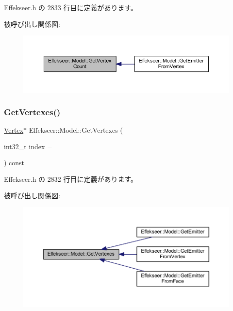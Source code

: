  Effekseer.\+h の 2833 行目に定義があります。

被呼び出し関係図\+:\nopagebreak
\begin{figure}[H]
\begin{center}
\leavevmode
\includegraphics[width=350pt]{class_effekseer_1_1_model_a63308d170d52e2b12fd1a479f5e6ccf1_icgraph}
\end{center}
\end{figure}
\mbox{\label{class_effekseer_1_1_model_a6116c0656bbf40185805e949243eef51}} 
\subsubsection{\texorpdfstring{Get\+Vertexes()}{GetVertexes()}}
{\footnotesize\ttfamily \mbox{\hyperlink{struct_effekseer_1_1_model_1_1_vertex}{Vertex}}$\ast$ Effekseer\+::\+Model\+::\+Get\+Vertexes (\begin{DoxyParamCaption}\item[{int32\+\_\+t}]{index = {} }\end{DoxyParamCaption}) const\hspace{0.3cm}{\ttfamily [inline]}}



 Effekseer.\+h の 2832 行目に定義があります。

被呼び出し関係図\+:\nopagebreak
\begin{figure}[H]
\begin{center}
\leavevmode
\includegraphics[width=350pt]{class_effekseer_1_1_model_a6116c0656bbf40185805e949243eef51_icgraph}
\end{center}
\end{figure}
\mbox{\label{class_effekseer_1_1_model_a7bec54c23ed23793809d05c229dc8bf2}} 
